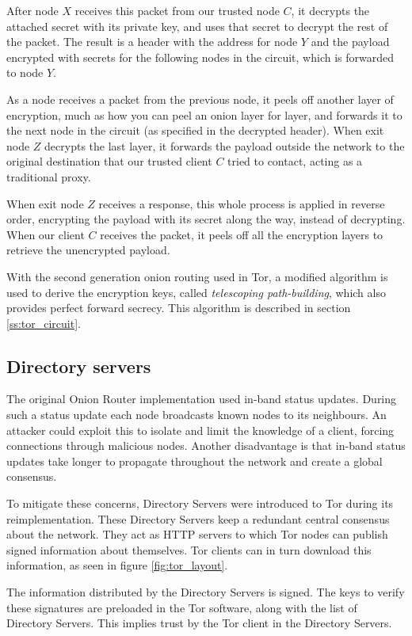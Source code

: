 \documentclass{article}
\begin{document}
		After node $X$ receives this packet from our trusted node $C$, it decrypts the attached secret with its private key, and uses that secret to decrypt the rest of the packet. The result is a header with the address for node $Y$ and the payload encrypted with secrets for the following nodes in the circuit, which is forwarded to node $Y$.
		
		As a node receives a packet from the previous node, it peels off another layer of encryption, much as how you can peel an onion layer for layer, and forwards it to the next node in the circuit (as specified in the decrypted header). When exit node $Z$ decrypts the last layer, it forwards the payload outside the network to the original destination that our trusted client $C$ tried to contact, acting as a traditional proxy.
		
		When exit node $Z$ receives a response, this whole process is applied in reverse order, encrypting the payload with its secret along the way, instead of decrypting. When our client $C$ receives the packet, it peels off all the encryption layers to retrieve the unencrypted payload.
		
		With the second generation onion routing used in Tor, a modified algorithm is used to derive the encryption keys, called \emph{telescoping path-building}, which also provides perfect forward secrecy. This algorithm is described in section \ref{ss:tor_circuit}.
		
	\subsection{Directory servers}
		The original Onion Router implementation used in-band status updates. During such a status update each node broadcasts known nodes to its neighbours. An attacker could exploit this to isolate and limit the knowledge of a client, forcing connections through malicious nodes. Another disadvantage is that in-band status updates take longer to propagate throughout the network and create a global consensus.
					
		To mitigate these concerns, Directory Servers were introduced to Tor during its reimplementation. These Directory Servers keep a redundant central consensus about the network. They act as HTTP servers to which Tor nodes can publish signed information about themselves. Tor clients can in turn download this information, as seen in figure \ref{fig:tor_layout}.
					
		The information distributed by the Directory Servers is signed. The keys to verify these signatures are preloaded in the Tor software, along with the list of Directory Servers. This implies trust by the Tor client in the Directory Servers.
\end{document}
